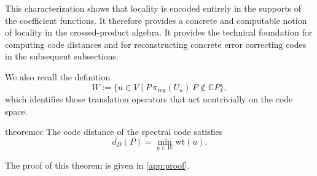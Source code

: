 \documentclass[12pt]{article}
\theoremstyle{definition} %
\theoremstyle{plain} %
\theoremstyle{remark} %
\theoremstyle{underline}
\begin{document}




This characterization shows that locality is encoded entirely in the supports of the coefficient functions. It therefore provides a concrete and computable notion of locality in the crossed-product algebra. It provides the technical foundation for computing code distances and for reconstructing concrete error correcting codes in the subsequent subsections.

We also recall the definition
\[
    W:=\{u\in V\mid P\,\pi_{\mathrm{reg}}(U_u)\,P\notin\mathbb C P\},
\]
which identifies those translation operators that act nontrivially on the code space.

\begin{restatable}{theorem}{cc}
    \label{thm:classical-distance}
    The code distance of the spectral code satisfies
    \[
        d_D(P)=\min_{u\in W}\mathrm{wt}(u).
    \]
\end{restatable}

The proof of this theorem is given in \ref{app:proof}.



\end{document}
